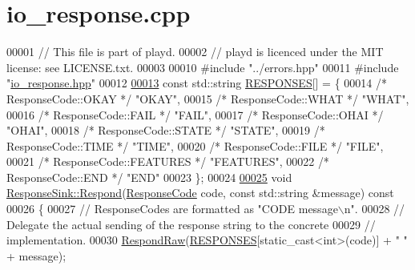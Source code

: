 \hypertarget{io__response_8cpp_source}{\section{io\+\_\+response.\+cpp}
\label{io__response_8cpp_source}
}

\begin{DoxyCode}
00001 \textcolor{comment}{// This file is part of playd.}
00002 \textcolor{comment}{// playd is licenced under the MIT license: see LICENSE.txt.}
00003 
00010 \textcolor{preprocessor}{#include "../errors.hpp"}
00011 \textcolor{preprocessor}{#include "\hyperlink{io__response_8hpp}{io\_response.hpp}"}
00012 
\hypertarget{io__response_8cpp_source_l00013}{}\hyperlink{io__response_8hpp_a9c1b923184d71c13e3dccf3756c20986}{00013} \textcolor{keyword}{const} std::string \hyperlink{io__response_8cpp_a9c1b923184d71c13e3dccf3756c20986}{RESPONSES}[] = \{
00014     \textcolor{comment}{/* ResponseCode::OKAY     */} \textcolor{stringliteral}{"OKAY"},
00015     \textcolor{comment}{/* ResponseCode::WHAT     */} \textcolor{stringliteral}{"WHAT"},
00016     \textcolor{comment}{/* ResponseCode::FAIL     */} \textcolor{stringliteral}{"FAIL"},
00017     \textcolor{comment}{/* ResponseCode::OHAI     */} \textcolor{stringliteral}{"OHAI"},
00018     \textcolor{comment}{/* ResponseCode::STATE    */} \textcolor{stringliteral}{"STATE"},
00019     \textcolor{comment}{/* ResponseCode::TIME     */} \textcolor{stringliteral}{"TIME"},
00020     \textcolor{comment}{/* ResponseCode::FILE     */} \textcolor{stringliteral}{"FILE"},
00021     \textcolor{comment}{/* ResponseCode::FEATURES */} \textcolor{stringliteral}{"FEATURES"},
00022     \textcolor{comment}{/* ResponseCode::END      */} \textcolor{stringliteral}{"END"}
00023 \};
00024 
\hypertarget{io__response_8cpp_source_l00025}{}\hyperlink{classResponseSink_ac2add6144c2804a6f0db34ad30046ed7}{00025} \textcolor{keywordtype}{void} \hyperlink{classResponseSink_ac2add6144c2804a6f0db34ad30046ed7}{ResponseSink::Respond}(\hyperlink{io__response_8hpp_af5828b68a5f305a17b90321710d9b546}{ResponseCode} code, \textcolor{keyword}{const} std::string &message)\textcolor{keyword}{
       const}
00026 \textcolor{keyword}{}\{
00027     \textcolor{comment}{// ResponseCodes are formatted as "CODE message\(\backslash\)n".}
00028     \textcolor{comment}{// Delegate the actual sending of the response string to the concrete}
00029     \textcolor{comment}{// implementation.}
00030     \hyperlink{classResponseSink_a128a514e39f23f2bcc97fea62e9de3c5}{RespondRaw}(\hyperlink{io__response_8cpp_a9c1b923184d71c13e3dccf3756c20986}{RESPONSES}[static\_cast<int>(code)] + \textcolor{stringliteral}{" "} + message);

\end{DoxyCode}
